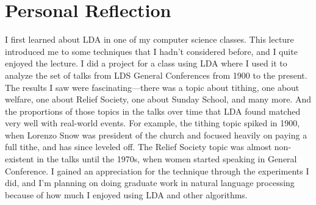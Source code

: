 \documentclass[onecolumn, 12pt]{article}
\begin{document}
\section*{Personal Reflection}

I first learned about LDA in one of my computer science classes.  This lecture
introduced me to some techniques that I hadn't considered before, and I quite
enjoyed the lecture.  I did a project for a class using LDA where I used it to
analyze the set of talks from LDS General Conferences from 1900 to the present.
The results I saw were fascinating---there was a topic about tithing, one about
welfare, one about Relief Society, one about Sunday School, and many more.  And
the proportions of those topics in the talks over time that LDA found matched
very well with real-world events.  For example, the tithing topic spiked in
1900, when Lorenzo Snow was president of the church and focused heavily on
paying a full tithe, and has since leveled off.  The Relief Society topic was
almost non-existent in the talks until the 1970s, when women started speaking
in General Conference.  I gained an appreciation for the technique through the
experiments I did, and I'm planning on doing graduate work in natural language
processing because of how much I enjoyed using LDA and other algorithms.
\end{document}

